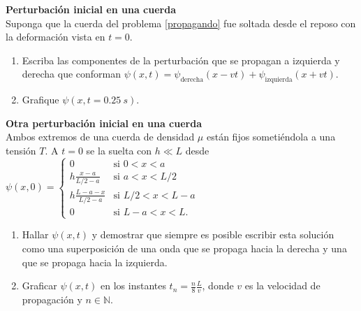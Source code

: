 \item 
\textbf{Perturbación inicial en una cuerda}\\
Suponga que la cuerda del problema \ref{propagando} fue soltada desde el reposo con la deformación vista en $t=0$.
\begin{enumerate}
	\item Escriba las componentes de la perturbación que se propagan a izquierda y derecha que conforman $\psi(x,t) = \psi_\text{derecha} (x - v t ) + \psi_\text{izquierda} ( x + v t )$.
	\item Grafique $\psi(x, t= \SI{0.25}{s})$.
\end{enumerate}



\item
\textbf{Otra perturbación inicial en una cuerda}\\
Ambos extremos de una cuerda de densidad $\mu$ están fijos sometiéndola a una tensión $T$.
A $t=0$ se la suelta con $h \ll L$ desde
$
\psi(x,0)=\begin{cases}
0 & \mbox{si }0<x<a\\
h\frac{x-a}{L/2-a} & \mbox{si }a<x<L/2\\
h\frac{L-a-x}{L/2-a} & \mbox{si }L/2<x<L-a\\
0 & \mbox{si }L-a<x<L .
\end{cases}
$
\begin{enumerate}
	\item Hallar $\psi(x,t)$ y demostrar que siempre es posible escribir esta solución como una superposición de una onda que se propaga hacia la derecha y una que se propaga hacia la izquierda.
	\item Graficar $\psi(x,t)$ en los instantes $t_n = \frac{n}{8} \frac{L}{v}$, donde $v$ es la velocidad de propagación y $n \in \mathbb{N}$.
\end{enumerate}


